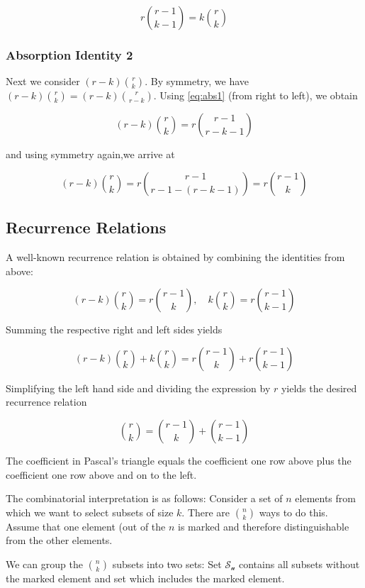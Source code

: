 \begin{equation}
\label{eq:abs1}
r {r-1 \choose k-1} = k {r \choose k}
\end{equation}

\subsubsection{Absorption Identity 2}

Next we consider $(r-k) {r \choose k}$. By symmetry, we have $(r-k) {r \choose k } = (r-k) {r \choose r-k}$. Using \eqref{eq:abs1} (from right to left), we obtain

\[ (r-k) {r \choose k} = r {r-1 \choose r-k-1} \]

and using symmetry again,we arrive at

\[ (r-k) {r \choose k} = r {r-1 \choose r-1-(r-k-1)} = r {r-1 \choose k} \]

\subsection{Recurrence Relations}

A well-known recurrence relation is obtained by combining the identities from above:

\[ (r-k) {r \choose k} =  r {r-1 \choose k}, \quad k {r \choose k} = r {r-1 \choose k-1}\]

Summing the respective right and left sides yields

\[ (r-k) {r \choose k} + k {r \choose k} = r {r-1 \choose k} + r {r-1 \choose k-1}\]

Simplifying the left hand side and dividing the expression by $r$ yields the desired recurrence relation

\begin{equation}
\label{eq:recur}
{r \choose k} = {r-1 \choose k} + {r-1 \choose k-1}
\end{equation}

The coefficient in Pascal's triangle equals the coefficient one row above plus the coefficient one row above and on to the left.

The combinatorial interpretation is as follows: Consider a set of $n$ elements from which we want to select subsets of size $k$. There are ${n \choose k}$ ways to do this. Assume that one element (out of the $n$ is marked and therefore distinguishable from the other elements.

We can group the ${n\choose k}$ subsets into two sets: Set $\mathcal{S_u}$ contains all subsets without the marked element and set which includes the marked element.

